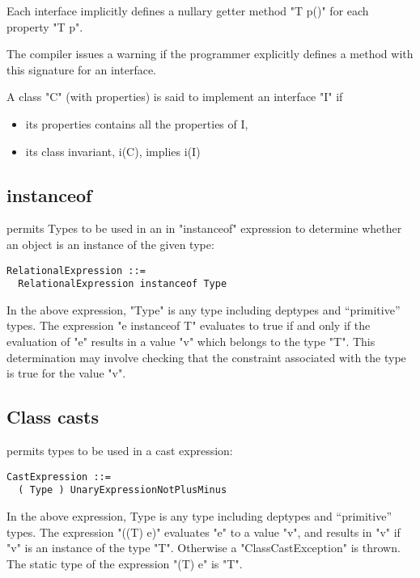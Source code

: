 Each interface implicitly defines a nullary getter method \xcd"T p()" for
each property \xcd"T p". 

\begin{staticrule*}
   The compiler issues a warning if the programmer
   explicitly defines a method with this signature for an interface.
  
\end{staticrule*}

A class \xcd"C" (with properties) is said to implement an interface \xcd"I" if
\begin{itemize}
  \item its properties contains all the properties of I,
\item its class invariant, i(C), implies i(I)
\end{itemize}


\subsection{instanceof} 

\Xten{} permits Types to be used in an in \xcd"instanceof" expression to
determine whether an object is an instance of the given type:

\begin{verbatim}
RelationalExpression ::= 
  RelationalExpression instanceof Type  
\end{verbatim}

In the above expression, \xcd"Type" is any type including deptypes and
``primitive'' types. The expression \xcd"e instanceof T" evaluates to true
if and only if the evaluation of \xcd"e" results in a value \xcd"v" which belongs
to the type \xcd"T". This determination may involve checking that the
constraint associated with the type is true for the value \xcd"v".

\subsection{Class casts}

\Xten{} permits types to be used in a cast expression:

\begin{verbatim}
CastExpression ::= 
  ( Type ) UnaryExpressionNotPlusMinus  
\end{verbatim}

In the above expression, Type is any type including deptypes and
``primitive'' types. The expression \xcd"((T) e)" evaluates \xcd"e" to
a value \xcd"v", and results in \xcd"v" if \xcd"v" is an instance of
the type \xcd"T". Otherwise a \xcd"ClassCastException" is thrown. The
static type of the expression \xcd"(T) e" is \xcd"T".

